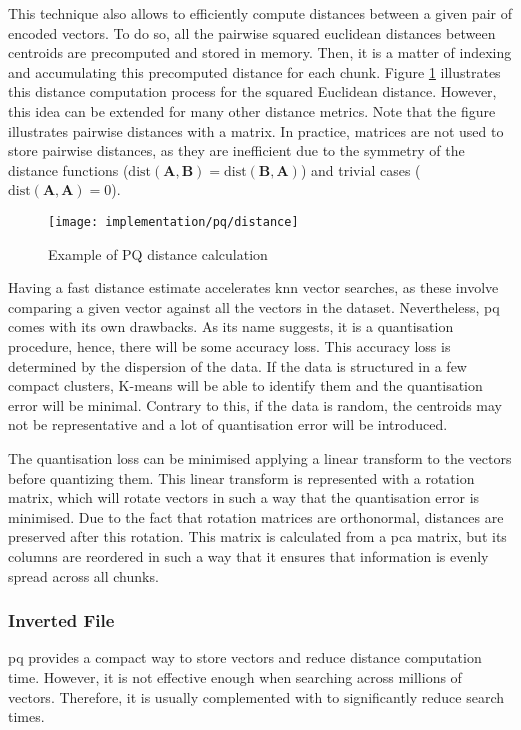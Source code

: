 \documentclass[../main.tex]{subfiles}
\begin{document}
This technique also allows to efficiently compute distances between a given pair of encoded vectors. To do so, all the pairwise squared euclidean distances between centroids are precomputed and stored in memory. Then, it is a matter of indexing and accumulating this precomputed distance for each chunk. Figure \ref{fig:4:pq_distance} illustrates this distance computation process for the squared Euclidean distance. However, this idea can be extended for many other distance metrics. Note that the figure illustrates pairwise distances with a matrix. In practice, matrices are not used to store pairwise distances, as they are inefficient due to the symmetry of the distance functions ($\text{dist}(\bm{A}, \bm{B}) = \text{dist}(\bm{B}, \bm{A})$) and trivial cases ($\text{dist}(\bm{A}, \bm{A}) = 0$).  

\begin{figure}[htbp]
    \centering
    \texttt{[image: implementation/pq/distance]}
    \caption{Example of PQ distance calculation}
    \label{fig:4:pq_distance}
\end{figure}

Having a fast distance estimate accelerates \gls{knn} vector searches, as these involve comparing a given vector against all the vectors in the dataset. Nevertheless, \gls{pq} comes with its own drawbacks. As its name suggests, it is a quantisation procedure, hence, there will be some accuracy loss. This accuracy loss is determined by the dispersion of the data. If the data is structured in a few compact clusters, K-means will be able to identify them and the quantisation error will be minimal. Contrary to this, if the data is random, the centroids may not be representative and a lot of quantisation error will be introduced.

The quantisation loss can be minimised applying a linear transform to the vectors before quantizing them. This linear transform is represented with a rotation matrix, which will rotate vectors in such a way that the quantisation error is minimised. Due to the fact that rotation matrices are orthonormal, distances are preserved after this rotation\cite{ge2013}. This matrix is calculated from a \gls{pca} matrix, but its columns are reordered in such a way that it ensures that information is evenly spread across all chunks. 

\subsubsection{Inverted File}
\Gls{pq} provides a compact way to store vectors and reduce distance computation time. However, it is not effective enough when searching across millions of vectors\cite{chang2022b}. Therefore, it is usually complemented with  to significantly reduce search times.
\end{document}
